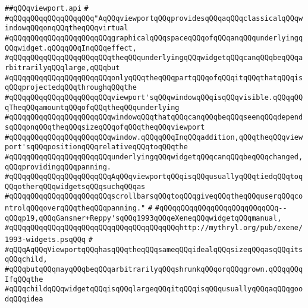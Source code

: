 \label{src/lib/x-kit/widget/old/layout/viewport.api}
\verb|##qQQqviewport.api|\newline
\verb|#|\newline
\verb|#qQQqqQQqqQQqqQQqqQQq"AqQQqviewportqQQqprovidesqQQqaqQQqclassicalqQQqwindowqQQqonqQQqtheqQQqvirtual|\newline
\verb|#qQQqqQQqqQQqqQQqqQQqqQQqgraphicalqQQqspaceqQQqofqQQqanqQQqunderlyingqQQqwidget.qQQqqQQqInqQQqeffect,|\newline
\verb|#qQQqqQQqqQQqqQQqqQQqqQQqtheqQQqunderlyingqQQqwidgetqQQqcanqQQqbeqQQqarbitrarilyqQQqlarge,qQQqbut|\newline
\verb|#qQQqqQQqqQQqqQQqqQQqqQQqonlyqQQqtheqQQqpartqQQqofqQQqitqQQqthatqQQqisqQQqprojectedqQQqthroughqQQqthe|\newline
\verb|#qQQqqQQqqQQqqQQqqQQqqQQqviewport'sqQQqwindowqQQqisqQQqvisible.qQQqqQQqTheqQQqamountqQQqofqQQqtheqQQqunderlying|\newline
\verb|#qQQqqQQqqQQqqQQqqQQqqQQqwindowqQQqthatqQQqcanqQQqbeqQQqseenqQQqdependsqQQqonqQQqtheqQQqsizeqQQqofqQQqtheqQQqviewport|\newline
\verb|#qQQqqQQqqQQqqQQqqQQqqQQqwindow.qQQqqQQqInqQQqaddition,qQQqtheqQQqviewport'sqQQqpositionqQQqrelativeqQQqtoqQQqthe|\newline
\verb|#qQQqqQQqqQQqqQQqqQQqqQQqunderlyingqQQqwidgetqQQqcanqQQqbeqQQqchanged,qQQqprovidingqQQqpanning.|\newline
\verb|#qQQqqQQqqQQqqQQqqQQqqQQqAqQQqviewportqQQqisqQQqusuallyqQQqtiedqQQqtoqQQqotherqQQqwidgetsqQQqsuchqQQqas|\newline
\verb|#qQQqqQQqqQQqqQQqqQQqqQQqscrollbarsqQQqtoqQQqgiveqQQqtheqQQquserqQQqcontrolqQQqoverqQQqtheqQQqpanning."|\newline
\verb|#|\newline
\verb|#qQQqqQQqqQQqqQQqqQQqqQQqqQQq--qQQqp19,qQQqGansner+Reppy'sqQQq1993qQQqeXeneqQQqwidgetqQQqmanual,|\newline
\verb|#qQQqqQQqqQQqqQQqqQQqqQQqqQQqqQQqqQQqqQQqhttp://mythryl.org/pub/exene/1993-widgets.psqQQq|\newline
\verb|#|\newline
\verb|#qQQqAqQQqViewportqQQqhasqQQqtheqQQqsameqQQqidealqQQqsizeqQQqasqQQqitsqQQqchild,|\newline
\verb|#qQQqbutqQQqmayqQQqbeqQQqarbitrarilyqQQqshrunkqQQqorqQQqgrown.qQQqqQQqIfqQQqthe|\newline
\verb|#qQQqchildqQQqwidgetqQQqisqQQqlargeqQQqitqQQqisqQQqusuallyqQQqaqQQqgoodqQQqidea|\newline
